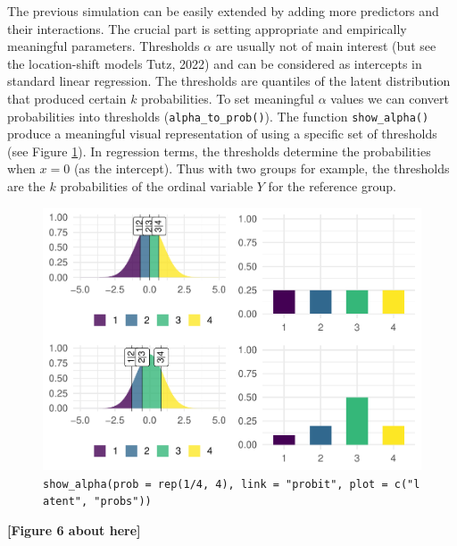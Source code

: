 \documentclass[
  man,floatsintext]{apa6}
\begin{document}
The previous simulation can be easily extended by adding more predictors and their interactions. The crucial part is setting appropriate and empirically meaningful parameters. Thresholds \(\alpha\) are usually not of main interest (but see the location-shift models Tutz, 2022) and can be considered as intercepts in standard linear regression. The thresholds are quantiles of the latent distribution that produced certain \(k\) probabilities. To set meaningful \(\alpha\) values we can convert probabilities into thresholds (\texttt{alpha\_to\_prob()}). The function \texttt{show\_alpha()} produce a meaningful visual representation of using a specific set of thresholds (see Figure \ref{fig:fig-show-th-example}). In regression terms, the thresholds determine the probabilities when \(x = 0\) (as the intercept). Thus with two groups for example, the thresholds are the \(k\) probabilities of the ordinal variable \(Y\) for the reference group.

\scriptsize

\begin{figure}

{\centering \includegraphics{paper-new_files/figure-latex/fig-show-th-example-1} 

}

\caption{\texttt{show\_alpha(prob\ =\ rep(1/4,\ 4),\ link\ =\ "probit",\ plot\ =\ c("latent",\ "probs"))}}\label{fig:fig-show-th-example}
\end{figure}

\begin{center}\textbf{[Figure 6 about here]} \end{center}

\normalsize
\end{document}
